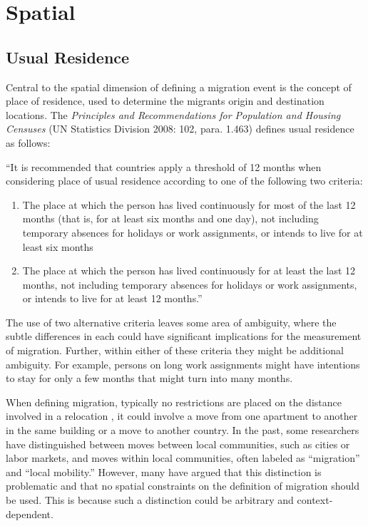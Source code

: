 \documentclass[
]{book}
\begin{document}
\hypertarget{spatial}{%
\section{Spatial}\label{spatial}}

\hypertarget{usual-residence}{%
\subsection{Usual Residence}\label{usual-residence}}

Central to the spatial dimension of defining a migration event is the concept of place of residence, used to determine the migrants origin and destination locations. The \emph{Principles and Recommendations for Population and Housing Censuses} (UN Statistics Division 2008: 102, para. 1.463) defines usual residence as follows:

``It is recommended that countries apply a threshold of 12 months when considering place of usual residence according to one of the following two criteria:

\begin{enumerate}
\def\labelenumi{\arabic{enumi}.}
\item
  The place at which the person has lived continuously for most of the last 12 months (that is, for at least six months and one day), not including temporary absences for holidays or work assignments, or intends to live for at least six months
\item
  The place at which the person has lived continuously for at least the last 12 months, not including temporary absences for holidays or work assignments, or intends to live for at least 12 months.''
\end{enumerate}

The use of two alternative criteria leaves some area of ambiguity, where the subtle differences in each could have significant implications for the measurement of migration. Further, within either of these criteria they might be additional ambiguity. For example, persons on long work assignments might have intentions to stay for only a few months that might turn into many months.

When defining migration, typically no restrictions are placed on the distance involved in a relocation \citet{Lee1966}, it could involve a move from one apartment to another in the same building or a move to another country. In the past, some researchers have distinguished between moves between local communities, such as cities or labor markets, and moves within local communities, often labeled as ``migration'' and ``local mobility.'' However, many have argued that this distinction is problematic and that no spatial constraints on the definition of migration should be used. This is because such a distinction could be arbitrary and context-dependent.
\end{document}
